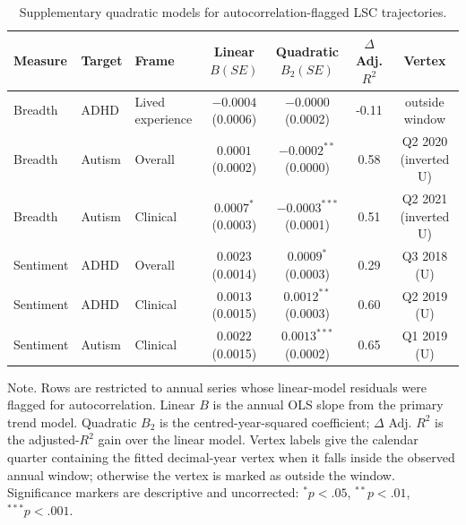 \begin{table}[t!]
\centering
\caption{Supplementary quadratic models for autocorrelation-flagged LSC trajectories.}
\label{tab:quadratic}
\scriptsize
\setlength{\tabcolsep}{3pt}
\begin{tabular}{@{}lllcccc@{}}
\toprule
Measure & Target & Frame & Linear $B(SE)$ & Quadratic $B_2(SE)$ & $\Delta$ Adj. $R^2$ & Vertex \\
\midrule
Breadth & ADHD & Lived experience & $-0.0004$ (0.0006) & $-0.0000$ (0.0002) & -0.11 & outside window \\
Breadth & Autism & Overall & $0.0001$ (0.0002) & $-0.0002^{**}$ (0.0000) & 0.58 & Q2 2020 (inverted U) \\
Breadth & Autism & Clinical & $0.0007^{*}$ (0.0003) & $-0.0003^{***}$ (0.0001) & 0.51 & Q2 2021 (inverted U) \\
Sentiment & ADHD & Overall & $0.0023$ (0.0014) & $0.0009^{*}$ (0.0003) & 0.29 & Q3 2018 (U) \\
Sentiment & ADHD & Clinical & $0.0013$ (0.0015) & $0.0012^{**}$ (0.0003) & 0.60 & Q2 2019 (U) \\
Sentiment & Autism & Clinical & $0.0022$ (0.0015) & $0.0013^{***}$ (0.0002) & 0.65 & Q1 2019 (U) \\
\bottomrule
\end{tabular}
\parbox{\linewidth}{\footnotesize Note. Rows are restricted to annual series whose linear-model residuals were flagged for autocorrelation. Linear $B$ is the annual OLS slope from the primary trend model. Quadratic $B_2$ is the centred-year-squared coefficient; $\Delta$ Adj. $R^2$ is the adjusted-$R^2$ gain over the linear model. Vertex labels give the calendar quarter containing the fitted decimal-year vertex when it falls inside the observed annual window; otherwise the vertex is marked as outside the window. Significance markers are descriptive and uncorrected: $^{*}p<.05$, $^{**}p<.01$, $^{***}p<.001$.}
\end{table}
